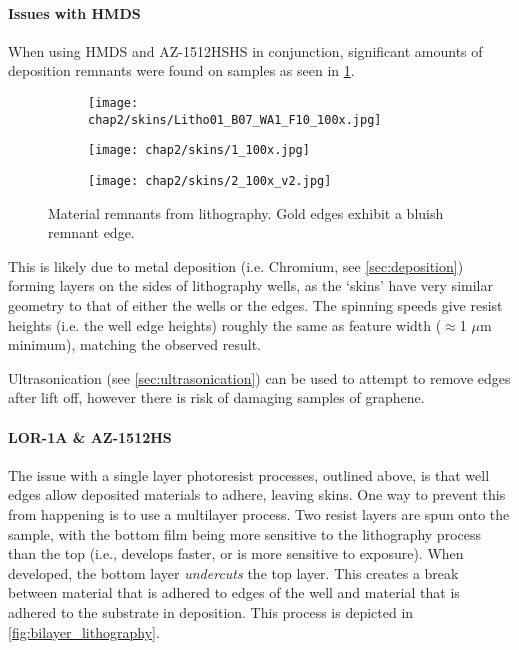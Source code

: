 \documentclass[../../Matt_Gebert_Honours_Thesis.tex]{subfiles}
\begin{document}
	\paragraph{Issues with HMDS}\label{sec:skin_issues}
	When using HMDS and AZ-1512HSHS in conjunction, significant amounts of deposition remnants were found on samples as seen in \cref{fig:lithography_skins}.
	
	\begin{figure}[H]
		\centering
		\begin{subfigure}[b]{0.3\textwidth}
			\texttt{[image: chap2/skins/Litho01\_B07\_WA1\_F10\_100x.jpg]}
		\end{subfigure}
		\begin{subfigure}[b]{0.3\textwidth}
			\texttt{[image: chap2/skins/1\_100x.jpg]}
		\end{subfigure}
		\begin{subfigure}[b]{0.3\textwidth}
			\texttt{[image: chap2/skins/2\_100x\_v2.jpg]}
		\end{subfigure}
		\caption[Material remanants from lithography]{Material remnants from lithography. Gold edges exhibit a bluish remnant edge.}\label{fig:lithography_skins}
	\end{figure}
	
	This is likely due to metal deposition (i.e. Chromium, see \cref{sec:deposition}) forming layers on the sides of lithography wells, as the `skins' have very similar geometry to that of either the wells or the edges. The spinning speeds give resist heights (i.e. the well edge heights) roughly the same as feature width ($\approx$1 $\mu$m minimum), matching the observed result. 
	
	Ultrasonication (see \cref{sec:ultrasonication}) can be used to attempt to remove edges after lift off, however there is risk of damaging samples of graphene.
	
	\paragraph{LOR-1A \& AZ-1512HS}
	The issue with a single layer photoresist processes, outlined above, is that well edges allow deposited materials to adhere, leaving skins. One way to prevent this from happening is to use a multilayer process. Two resist layers are spun onto the sample, with the bottom film being more sensitive to the lithography process than the top (i.e., develops faster, or is more sensitive to exposure). When developed, the bottom layer \textit{undercuts} the top layer. This creates a break between material that is adhered to edges of the well and material that is adhered to the substrate in deposition. This process is depicted in \cref{fig:bilayer_lithography}.
	
\end{document}
